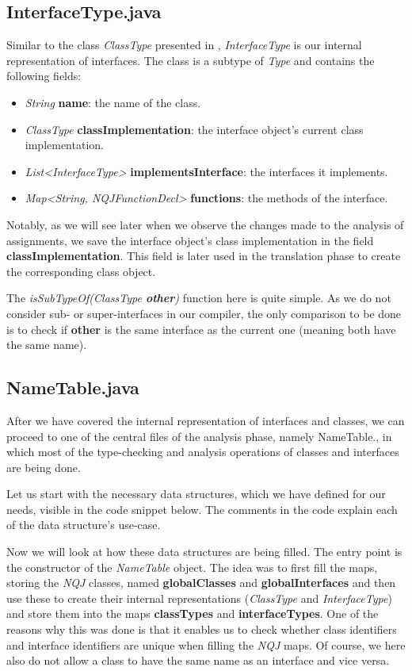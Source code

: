 \subsection{InterfaceType.java}
Similar to the class \textit{ClassType} presented in ,
\textit{InterfaceType} is our internal representation of interfaces.
The class is a subtype of \textit{Type} and contains the following fields:
\begin{itemize}
    \item \textit{String} \textbf{name}: the name of the class.
    \item \textit{ClassType} \textbf{classImplementation}: the interface object's current class implementation.
    \item \textit{List<InterfaceType>} \textbf{implementsInterface}: the interfaces it implements.
    \item \textit{Map<String, NQJFunctionDecl>} \textbf{functions}: the methods of the interface.
\end{itemize}
Notably, as we will see later when we observe the changes made to the analysis of assignments,
we save the interface object's class implementation in the field \textbf{classImplementation}.
This field is later used in the translation phase to create the corresponding class object.

The  \textit{isSubTypeOf(ClassType \textbf{other})} function here is quite simple.
As we do not consider sub- or super-interfaces in our compiler, the only comparison to be done is
to check if \textbf{other} is the same interface as the current one (meaning both have the same name).

\subsection{NameTable.java}
After we have covered the internal representation of interfaces and classes, we can proceed to
one of the central files of the analysis phase, namely NameTable.\@java,
in which most of the type-checking and analysis operations of classes and interfaces
are being done.

Let us start with the necessary data structures, which we have defined for our needs, visible in the code snippet below.
The comments in the code explain each of the data structure's use-case.


Now we will look at how these data structures are being filled.
The entry point is the constructor of the \textit{NameTable} object.
The idea was to first fill the maps, storing the \textit{NQJ} classes, named 
\textbf{globalClasses} and \textbf{globalInterfaces} and then use these to
create their internal representations (\textit{ClassType} and \textit{InterfaceType})
and store them into the maps \textbf{classTypes} and \textbf{interfaceTypes}.
One of the reasons why this was done is that it enables us to check whether class identifiers and interface identifiers are unique
when filling the \textit{NQJ} maps.
Of course, we here also do not allow a class to have the same name as an interface and vice versa.

